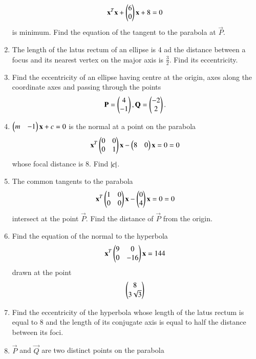 \documentclass[journal,12pt,twocolumn]{IEEEtran}
\begin{document}
\begin{enumerate}[label=\arabic*.]
\begin{equation}
\mathbf{x}^T\mathbf{x} +\begin{pmatrix}6 \\ 0 \end{pmatrix}\mathbf{x} + 8 = 0
\end{equation}
%
is minimum.  Find the equation of the tangent to the parabola at $\vec{P}$.
\item The length of the latus rectum of an ellipse is 4 ad the distance between a focus and its nearest
vertex on the major axis is $\frac{3}{2}$.  Find its eccentricity.
\item Find the eccentricity of an ellipse having centre at the origin, axes along the coordinate axes and 
passing through the points 
\begin{equation}
\mathbf{P} = \begin{pmatrix}4\\-1\end{pmatrix}, 
\mathbf{Q} = \begin{pmatrix}-2\\2\end{pmatrix}. 
\end{equation}
\item $\begin{pmatrix}m & -1\end{pmatrix}\mathbf{x} + c =0$ is the normal at a point on the parabola
\begin{equation}
\mathbf{x}^T\begin{pmatrix}0 & 0 \\ 0 & 1\end{pmatrix}\mathbf{x} -\begin{pmatrix}8 & 0 \end{pmatrix}\mathbf{x} = 0
 = 0
\end{equation}
%
whose focal distance is 8.  Find $\left\vert c\right\vert$.
\item The common tangents to the parabola
\begin{equation}
\mathbf{x}^T\begin{pmatrix}1 & 0 \\ 0 & 0\end{pmatrix}\mathbf{x} -\begin{pmatrix}0\\ 4 \end{pmatrix}\mathbf{x} = 0
 = 0
\end{equation}
%
intersect at the point $\vec{P}$.  Find the distance of $\vec{P}$ from the origin.
\item Find the equation of the normal to the hyperbola
\begin{equation}
\mathbf{x}^T\begin{pmatrix}9 & 0 \\ 0 & -16\end{pmatrix}\mathbf{x}  = 144
\end{equation}
drawn at the point
\begin{equation}
\begin{pmatrix}8\\ 3 \sqrt{3}\end{pmatrix}
\end{equation}
\item Find the eccentricity of the hyperbola whose length of the latus rectum is equal to 8 and the length of 
its conjugate axis is equal to half the distance between its foci. 
\item $\vec{P}$ and $\vec{Q}$ are two distinct points on the parabola
\begin{equation}

\end{equation}
\end{enumerate}
\end{document}
